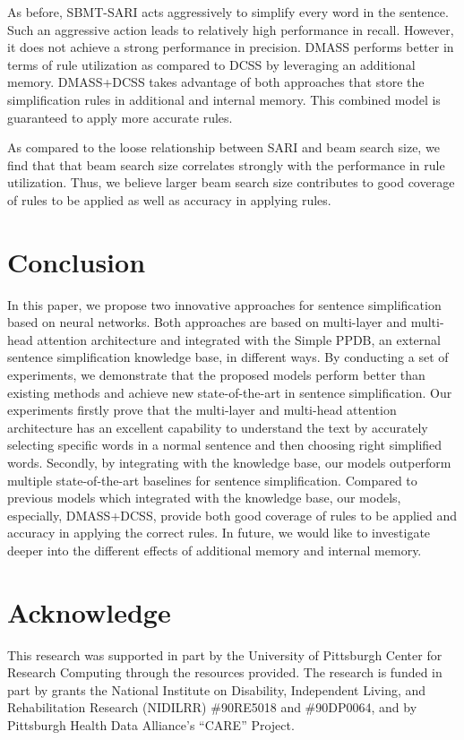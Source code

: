\documentclass[11pt,a4paper]{article}
\begin{document}
As before, SBMT-SARI acts aggressively to simplify every word in the sentence. Such an aggressive action leads to relatively high performance in recall. However, it does not achieve a strong performance in precision. 
DMASS performs better in terms of rule utilization as compared to DCSS by leveraging an additional memory. 
DMASS+DCSS takes advantage of both approaches that store the simplification rules in additional and internal memory. This combined model is guaranteed to apply more accurate rules.

As compared to the loose relationship between SARI and beam search size, 
we find that that beam search size correlates strongly with the performance in rule utilization. Thus, we believe larger beam search size contributes to good coverage of rules to be applied as well as accuracy in applying rules. 





\section{Conclusion}

In this paper, we propose two innovative approaches for sentence simplification based on neural networks. Both approaches are based on multi-layer and multi-head attention architecture and integrated with the Simple PPDB, an external sentence simplification knowledge base, in different ways. By conducting a set of experiments, we demonstrate that the proposed models perform better than existing methods and achieve new state-of-the-art in sentence simplification. 
Our experiments firstly prove that the multi-layer and multi-head attention architecture has an excellent capability to understand the text by accurately selecting specific words in a normal sentence and then choosing right simplified words. Secondly, by integrating with the knowledge base, our models outperform multiple state-of-the-art baselines for sentence simplification.
Compared to previous models which integrated with the knowledge base, our models, especially, DMASS+DCSS, provide both good coverage of rules to be applied and accuracy in applying the correct rules.
In future, we would like to investigate deeper into the different effects of additional memory and internal memory.

\section{Acknowledge}

This research was supported in part by the University of Pittsburgh Center for Research Computing through the resources provided.
The research is funded in part by grants the National Institute on Disability, Independent Living, and Rehabilitation Research (NIDILRR) \#90RE5018 and \#90DP0064, and by Pittsburgh Health Data Alliance's ``CARE'' Project.




\appendix
\end{document}
